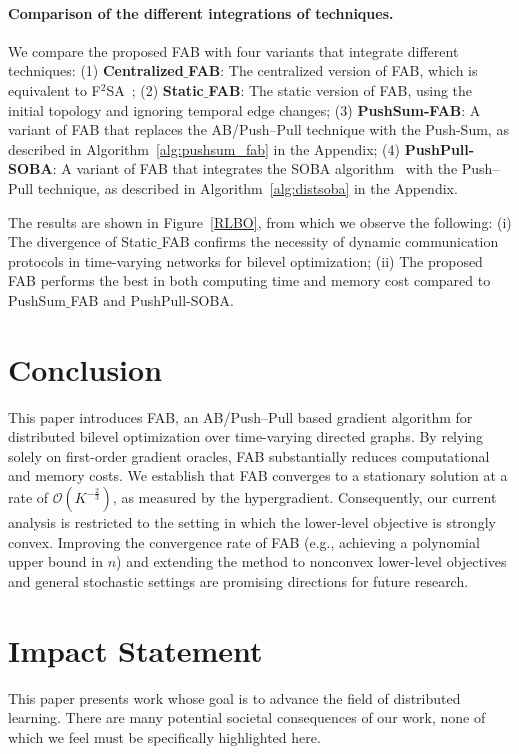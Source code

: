 \documentclass{article}
\theoremstyle{plain}
\theoremstyle{definition}
\theoremstyle{remark}
\begin{document}
\paragraph{Comparison of the different integrations of techniques.} 
We compare the proposed FAB with four variants that integrate different techniques:  
(1) \textbf{Centralized$\_$FAB}: The centralized version of FAB, which is equivalent to F$^{2}$SA~\cite{pmlr-v202-kwon23c};  
(2) \textbf{Static$\_$FAB}: The static version of FAB, using the initial topology and ignoring temporal edge changes;  
(3) \textbf{PushSum-FAB}: A variant of FAB that replaces the AB/Push–Pull technique with the Push-Sum, as described in Algorithm~\ref{alg:pushsum_fab} in the Appendix;  
(4) \textbf{PushPull-SOBA}: A variant of FAB that integrates the SOBA algorithm~\cite{dagreou2022framework} with the Push–Pull technique, as described in Algorithm~\ref{alg:distsoba} in the Appendix.

The results are shown in Figure~\ref{RLBO}, from which we observe the following: 
(i) The divergence of Static$\_$FAB confirms the necessity of dynamic communication protocols in time-varying networks for bilevel optimization;  
(ii) The proposed FAB performs the best in both computing time and memory cost compared to PushSum$\_$FAB and PushPull-SOBA. 





\section{Conclusion}

This paper introduces FAB, an AB/Push–Pull based gradient algorithm for distributed bilevel optimization over time-varying directed graphs. By relying solely on first-order gradient oracles, FAB substantially reduces computational and memory costs. We establish that FAB converges to a stationary solution at a rate of $\mathcal{O}(K^{-\frac{2}{3}})$, as measured by the hypergradient. Consequently, our current analysis is restricted to the setting in which the lower-level objective is strongly convex. 
Improving the convergence rate of FAB (e.g., achieving a polynomial upper bound in $n$) and extending the method to nonconvex lower-level objectives and general stochastic settings are promising directions for future research.


\section*{Impact Statement}
This paper presents work whose goal is to advance the field of distributed learning. There are many potential societal consequences of our work, none of which we feel must be specifically highlighted here.
\end{document}
